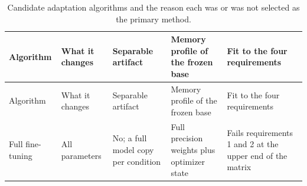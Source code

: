 \begin{landscape}
\begingroup\scriptsize\setlength{\tabcolsep}{3pt}\sloppy
\begin{longtable}[]{@{}
  >{\raggedright\arraybackslash}p{}
  >{\raggedright\arraybackslash}p{}
  >{\raggedright\arraybackslash}p{}
  >{\raggedright\arraybackslash}p{}
  >{\raggedright\arraybackslash}p{}@{}}
\caption{Candidate adaptation algorithms and the reason each was or was not selected as the primary method.}\tabularnewline
\toprule\noalign{}
\begin{minipage}[b]{\linewidth}\raggedright
Algorithm
\end{minipage} & \begin{minipage}[b]{\linewidth}\raggedright
What it changes
\end{minipage} & \begin{minipage}[b]{\linewidth}\raggedright
Separable artifact
\end{minipage} & \begin{minipage}[b]{\linewidth}\raggedright
Memory profile of the frozen base
\end{minipage} & \begin{minipage}[b]{\linewidth}\raggedright
Fit to the four requirements
\end{minipage} \\
\midrule\noalign{}
\endfirsthead
\toprule\noalign{}
\begin{minipage}[b]{\linewidth}\raggedright
Algorithm
\end{minipage} & \begin{minipage}[b]{\linewidth}\raggedright
What it changes
\end{minipage} & \begin{minipage}[b]{\linewidth}\raggedright
Separable artifact
\end{minipage} & \begin{minipage}[b]{\linewidth}\raggedright
Memory profile of the frozen base
\end{minipage} & \begin{minipage}[b]{\linewidth}\raggedright
Fit to the four requirements
\end{minipage} \\
\midrule\noalign{}
\endhead
\bottomrule\noalign{}
\endlastfoot
Full fine-tuning & All parameters & No; a full model copy per condition & Full precision weights plus optimizer state & Fails requirements 1 and 2 at the upper end of the matrix \\

\end{longtable}
\end{landscape}
